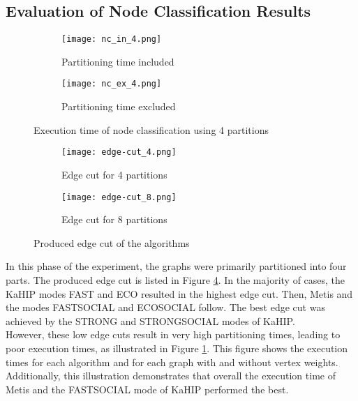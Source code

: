 \documentclass[acmsmall,nonacm,screen,review]{acmart}
\begin{document}
\subsection{Evaluation of Node Classification Results}
\begin{figure}[bt!]
     \centering
     \begin{subfigure}[b]{0.45\textwidth}
         \centering
         \texttt{[image: nc\_in\_4.png]}
         \caption{Partitioning time included}
         \label{nc_in_4}
     \end{subfigure}
     \hfill
     \begin{subfigure}[b]{0.45\textwidth}
         \centering
         \texttt{[image: nc\_ex\_4.png]}
         \caption{Partitioning time excluded}
         \label{nc_ex_4}
     \end{subfigure}
     \caption{Execution time of node classification using 4 partitions}
     \label{nc_results}
\end{figure}
\begin{figure}[bt!]
     \centering
     \begin{subfigure}[b]{0.45\textwidth}
         \centering
         \texttt{[image: edge-cut\_4.png]}
         \caption{Edge cut for 4 partitions}
         \label{cut_4}
     \end{subfigure}
     \hfill
     \begin{subfigure}[b]{0.45\textwidth}
         \centering
         \texttt{[image: edge-cut\_8.png]}
         \caption{Edge cut for 8 partitions}
         \label{cut_8}
     \end{subfigure}
     \caption{Produced edge cut of the algorithms}
     \label{cut}
\end{figure}
In this phase of the experiment, the graphs were primarily partitioned into four parts. The produced edge cut is listed in Figure \ref{cut_4}. In the majority of cases, the KaHIP modes FAST and ECO resulted in the highest edge cut. Then, Metis and the modes FASTSOCIAL and ECOSOCIAL follow. The best edge cut was achieved by the STRONG and STRONGSOCIAL modes of KaHIP. \\ 
However, these low edge cuts result in very high partitioning times, leading to poor execution times, as illustrated in Figure \ref{nc_in_4}. This figure shows the execution times for each algorithm and for each graph with and without vertex weights. Additionally, this illustration demonstrates that overall the execution time of Metis and the FASTSOCIAL mode of KaHIP performed the best.  \\
\end{document}
